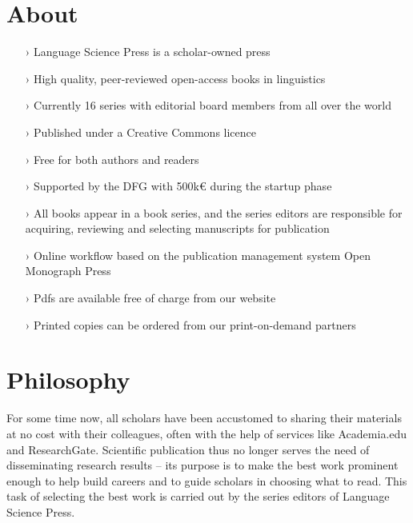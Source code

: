 \documentclass[
notumble,
nofoldmark,
]{leaflet}
\begin{document}
\section{\sffamily\Large\bfseries About}
\begin{itemize}  
\setlength{\itemsep}{-3pt} 
 \item[›] Language Science Press is a scholar-owned press
 \item[›]  High quality, peer-reviewed open-access books in linguistics
  \item[›] Currently 16 series with editorial board members from all over the world
 \item[›] Published under a Creative Commons licence
 \item[›] Free for both authors and readers
 \item[›] Supported by the DFG with 500k{\euro} during the startup phase

 \item[›] All books appear in a book series, and the series editors are responsible for acquiring, reviewing and selecting manuscripts for publication
 \item[›] Online workflow based on the publication management system Open Monograph Press
 \item[›] Pdfs are available free of charge from our website 
 \item[›] Printed copies can be ordered from our print-on-demand partners
\end{itemize}
 
 \section{\sffamily\Large\bfseries Philosophy} 
 For some time now, all scholars have been accustomed to sharing their materials at no cost with their colleagues, often with the help of services like Academia.edu and ResearchGate. Scientific publication thus no longer serves the need of disseminating research results -- its purpose is to make the best work prominent enough to help build careers and to guide scholars in choosing what to read. This task of selecting the best work is carried out by the series editors of Language Science Press.
\end{document}

